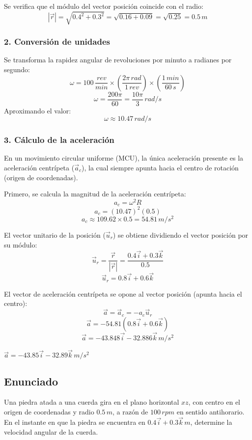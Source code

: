 \documentclass[12pt, a4paper]{article}
\begin{document}
Se verifica que el módulo del vector posición coincide con el radio:
$$ |\vec{r}| = \sqrt{0.4^2 + 0.3^2} = \sqrt{0.16 + 0.09} = \sqrt{0.25} = 0.5 \, \si{m} $$

\subsubsection*{2. Conversión de unidades}
Se transforma la rapidez angular de revoluciones por minuto a radianes por segundo:
$$ \omega = 100 \, \frac{\si{rev}}{\si{min}} \times \left( \frac{2\pi \, \si{rad}}{1 \, \si{rev}} \right) \times \left( \frac{1 \, \si{min}}{60 \, \si{s}} \right) $$
$$ \omega = \frac{200\pi}{60} = \frac{10\pi}{3} \, \si{rad/s} $$
Aproximando el valor:
$$ \omega \approx 10.47 \, \si{rad/s} $$

\subsubsection*{3. Cálculo de la aceleración}
En un movimiento circular uniforme (MCU), la única aceleración presente es la aceleración centrípeta ($\vec{a}_c$), la cual siempre apunta hacia el centro de rotación (origen de coordenadas).

Primero, se calcula la magnitud de la aceleración centrípeta:
$$ a_c = \omega^2 R $$
$$ a_c = (10.47)^2 (0.5) $$
$$ a_c \approx 109.62 \times 0.5 = 54.81 \, \si{m/s^2} $$

El vector unitario de la posición ($\vec{u}_r$) se obtiene dividiendo el vector posición por su módulo:
$$ \vec{u}_r = \frac{\vec{r}}{|\vec{r}|} = \frac{0.4\vec{i} + 0.3\vec{k}}{0.5} $$
$$ \vec{u}_r = 0.8\vec{i} + 0.6\vec{k} $$

El vector de aceleración centrípeta se opone al vector posición (apunta hacia el centro):
$$ \vec{a} = \vec{a}_c = -a_c \vec{u}_r $$
$$ \vec{a} = -54.81 (0.8\vec{i} + 0.6\vec{k}) $$
$$ \vec{a} = -43.848\vec{i} - 32.886\vec{k} \, \si{m/s^2} $$

\begin{tcolorbox}[colback=green!5!white, colframe=green!50!black, title=Respuesta Final]
\centering \Large $\vec{a} = -43.85\vec{i} - 32.89\vec{k} \, \si{m/s^2}$
\end{tcolorbox}

\newpage

\subsection*{Enunciado}
Una piedra atada a una cuerda gira en el plano horizontal $xz$, con centro en el origen de coordenadas y radio $0.5 \, \si{m}$, a razón de $100 \, \si{rpm}$ en sentido antihorario. En el instante en que la piedra se encuentra en $0.4\vec{i} + 0.3\vec{k} \, \si{m}$, determine la velocidad angular de la cuerda.
\end{document}

